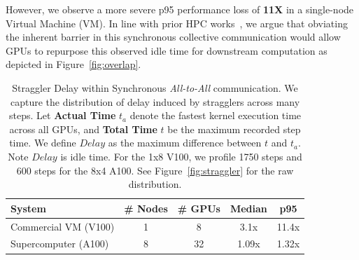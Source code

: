 However, we observe a more severe p95 performance loss of \textbf{11X} in a single-node Virtual Machine (VM).
In line with prior HPC works~\cite{1639320, 10.1145/3545008.3545056},
we argue that obviating the inherent barrier in this synchronous collective communication would
allow GPUs to repurpose this observed idle time for downstream computation as depicted in Figure~\ref{fig:overlap}.
\begin{table}[!h]
    \centering
    \caption{Straggler Delay within Synchronous \emph{All-to-All} communication.
    We capture the distribution of delay induced by stragglers across many steps.
    Let \textbf{Actual Time} $t_a$ denote the fastest kernel execution time across all GPUs,
        and \textbf{Total Time} $t$ be the maximum recorded step time. We define
        $Delay$ as the maximum difference between $t$ and $t_a$. Note $Delay$ is idle time. For the
        1x8 V100, we profile 1750 steps and 600 steps for the 8x4 A100. See Figure~\ref{fig:straggler}
        for the raw distribution.}
    \label{tab:s_delays}
    \begin{tabular}{@{}lcccc@{}}
        \toprule
        \textbf{System}      & \multicolumn{1}{l}{\textbf{\# Nodes}} & \multicolumn{1}{l}{\textbf{\# GPUs}} & \textbf{Median} & \textbf{p95} \\ \midrule
        Commercial VM (V100) & 1                                     & 8                                    & 3.1x            & 11.4x        \\
        Supercomputer (A100) & 8                                     & 32                                   & 1.09x           & 1.32x        \\ \bottomrule
    \end{tabular}
\end{table}
